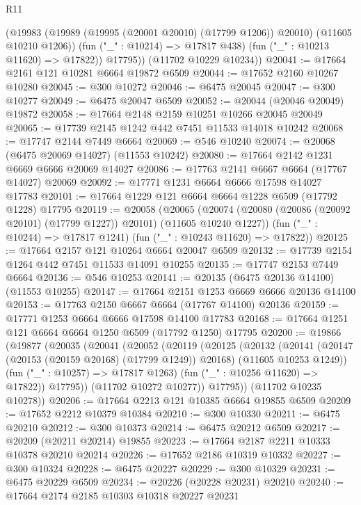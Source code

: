 \begin{lexlean}{R11}
\begin{coremodule}
            (@19983 (@19989 (@19995 (@20001 @20010) (@17799 @1206)) @20010) (@11605 @10210 @1206))
            (fun ("_" : @10214) => @17817 @438)
            (fun ("_" : @10213 @11620) => @17822))
          @17795))
      (@11702 @10229 @10234))
@20041 := @17664 @2161 @121 @10281 @6664 @19872 @6509
@20044 := @17652 @2160 @10267 @10280
@20045 := @300 @10272
@20046 := @6475 @20045
@20047 := @300 @10277
@20049 := @6475 @20047 @6509
@20052 := @20044 (@20046 @20049) @19872
@20058 := @17664 @2148 @2159 @10251 @10266 @20045 @20049
@20065 := @17739 @2145 @1242 @442 @7451 @11533 @14018 @10242
@20068 := @17747 @2144 @7449 @6664
@20069 := @546 @10240
@20074 := @20068 (@6475 @20069 @14027) (@11553 @10242)
@20080 := @17664 @2142 @1231 @6669 @6666 @20069 @14027
@20086 := @17763 @2141 @6667 @6664 (@17767 @14027) @20069
@20092 := @17771 @1231 @6664 @6666 @17598 @14027 @17783
@20101 := @17664 @1229 @121 @6664 @6664 @1228 @6509 (@17792 @1228) @17795
@20119 := @20058
    (@20065
      (@20074 (@20080 (@20086 (@20092 @20101) (@17799 @1227)) @20101) (@11605 @10240 @1227))
      (fun ("_" : @10244) => @17817 @1241)
      (fun ("_" : @10243 @11620) => @17822))
@20125 := @17664 @2157 @121 @10264 @6664 @20047 @6509
@20132 := @17739 @2154 @1264 @442 @7451 @11533 @14091 @10255
@20135 := @17747 @2153 @7449 @6664
@20136 := @546 @10253
@20141 := @20135 (@6475 @20136 @14100) (@11553 @10255)
@20147 := @17664 @2151 @1253 @6669 @6666 @20136 @14100
@20153 := @17763 @2150 @6667 @6664 (@17767 @14100) @20136
@20159 := @17771 @1253 @6664 @6666 @17598 @14100 @17783
@20168 := @17664 @1251 @121 @6664 @6664 @1250 @6509 (@17792 @1250) @17795
@20200 := @19866
    (@19877
      (@20035
        (@20041
          (@20052
            (@20119
              (@20125
                (@20132
                  (@20141
                    (@20147 (@20153 (@20159 @20168) (@17799 @1249)) @20168)
                    (@11605 @10253 @1249))
                  (fun ("_" : @10257) => @17817 @1263)
                  (fun ("_" : @10256 @11620) => @17822))
                @17795))
            (@11702 @10272 @10277))
          @17795))
      (@11702 @10235 @10278))
@20206 := @17664 @2213 @121 @10385 @6664 @19855 @6509
@20209 := @17652 @2212 @10379 @10384
@20210 := @300 @10330
@20211 := @6475 @20210
@20212 := @300 @10373
@20214 := @6475 @20212 @6509
@20217 := @20209 (@20211 @20214) @19855
@20223 := @17664 @2187 @2211 @10333 @10378 @20210 @20214
@20226 := @17652 @2186 @10319 @10332
@20227 := @300 @10324
@20228 := @6475 @20227
@20229 := @300 @10329
@20231 := @6475 @20229 @6509
@20234 := @20226 (@20228 @20231) @20210
@20240 := @17664 @2174 @2185 @10303 @10318 @20227 @20231

\end{coremodule}
\end{lexlean}
